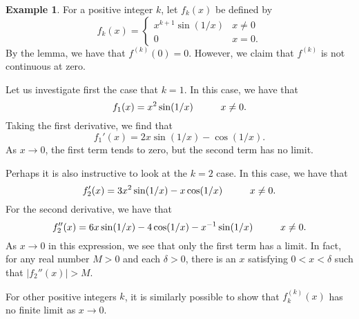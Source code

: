 \documentclass[12pt]{article}
\theoremstyle{definition}
\newtheorem{example}[definition]{Example}
\theoremstyle{theorem}
\begin{document}
\begin{example}
For a positive integer $k$, let $f_k(x)$ be defined by 
\[
f_k(x) = \begin{cases}
x^{k+1} \sin(1/x) & x \ne 0 \\
0 & x = 0.
\end{cases}
\]
By the lemma, we have that $f^{(k)}(0) = 0$. However, we claim that $f^{(k)}$ is not continuous at zero. 

Let us investigate first the case that $k=1$. In this case, we have that 
\[
f_1(x) = x^2 \sin(1/x) \hspace{10mm} x \ne 0 .
\]
Taking the first derivative, we find that 
\[
f_1'(x) = 2x \sin(1/x) - \cos(1/x).
\]
As $x \to 0$, the first term tends to zero, but the second term has no limit. 

Perhaps it is also instructive to look at the $k=2$ case. In this case, we have that 
\[
f_2'(x) = 3x^2 \sin(1/x) - x \cos(1/x) \hspace{10mm} x \ne 0.
\]
For the second derivative, we have that 
\[
f_2''(x) = 6x \sin(1/x) - 4 \cos(1/x)  -x^{-1}\sin(1/x) \hspace{10mm} x \ne 0.
\]
As $x \to 0$ in this expression, we see that only the first term has a limit. In fact, for any real number $M > 0$ and each $\delta > 0$, there is an $x$ satisfying $0 < x < \delta$ such that $|f_2''(x)| > M$. 

For other positive integers $k$, it is similarly possible to show that $f^{(k)}_k(x)$ has no finite limit as $x \to 0$. 
\end{example}
\end{document}
